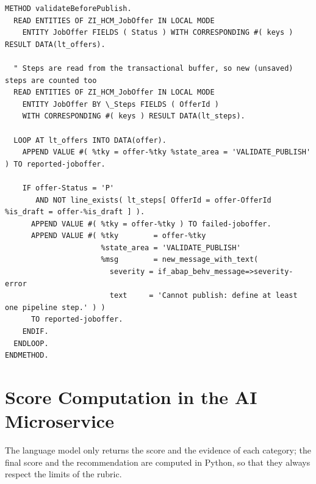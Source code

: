 \begin{lstlisting}[language=ABAPRAP, caption={Validation \texttt{validateBeforePublish} of the job offer}, label={lst:validate_publish}]
METHOD validateBeforePublish.
  READ ENTITIES OF ZI_HCM_JobOffer IN LOCAL MODE
    ENTITY JobOffer FIELDS ( Status ) WITH CORRESPONDING #( keys ) RESULT DATA(lt_offers).

  " Steps are read from the transactional buffer, so new (unsaved) steps are counted too
  READ ENTITIES OF ZI_HCM_JobOffer IN LOCAL MODE
    ENTITY JobOffer BY \_Steps FIELDS ( OfferId )
    WITH CORRESPONDING #( keys ) RESULT DATA(lt_steps).

  LOOP AT lt_offers INTO DATA(offer).
    APPEND VALUE #( %tky = offer-%tky %state_area = 'VALIDATE_PUBLISH' ) TO reported-joboffer.

    IF offer-Status = 'P'
       AND NOT line_exists( lt_steps[ OfferId = offer-OfferId %is_draft = offer-%is_draft ] ).
      APPEND VALUE #( %tky = offer-%tky ) TO failed-joboffer.
      APPEND VALUE #( %tky        = offer-%tky
                      %state_area = 'VALIDATE_PUBLISH'
                      %msg        = new_message_with_text(
                        severity = if_abap_behv_message=>severity-error
                        text     = 'Cannot publish: define at least one pipeline step.' ) )
      TO reported-joboffer.
    ENDIF.
  ENDLOOP.
ENDMETHOD.
\end{lstlisting}

\section{Score Computation in the AI Microservice}

The language model only returns the score and the evidence of each category; the final score and the recommendation are computed in Python, so that they always respect the limits of the rubric.

